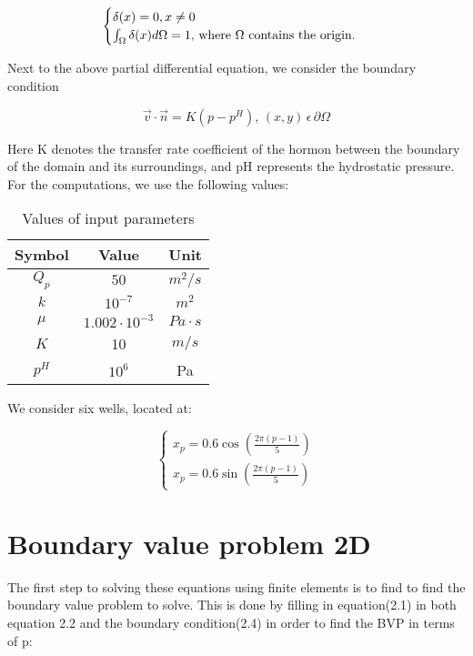 \documentclass{report}
\begin{document}
\begin{equation}
	\begin{cases} 
		\delta(x) = 0,x \neq 0 \\ \int_{\Omega}\delta(x)d\Omega = 1,$  where $\Omega $  contains the origin.$
	\end{cases} 
\end{equation}

\medskip
Next to the above partial differential equation, we consider the boundary condition 

\begin{equation}
	\vec{v}\cdot\vec{n}=K(p-p^H), \, (x,y)\, \epsilon\,  \partial\Omega
\end{equation}
\bigskip

Here K denotes the transfer rate coefficient of the hormon between the boundary of the domain and its surroundings, and pH represents the hydrostatic pressure. For the computations, we use the following values:


\begin{table}[ht]
	\caption{Values of input parameters} %
	\centering %
	\begin{tabular}{c c c} %
		\hline\hline %
		Symbol & Value & Unit\\ [0.5ex] %
		\hline %
		$Q_p$ & $50$ & $m^2/s$ \\ %
		$k$ & $10^{-7}$ & $m^2$ \\
		$\mu$ & $1.002\cdot 10^{-3}$ & $Pa\cdot s$ \\
		$K$ & 10 & $m/s$ \\
		$p^H$ & $10^6$ & Pa \\ [1ex] %
		\hline %
	\end{tabular}
	\label{table:nonlin} %
\end{table}
\bigskip

We consider six wells, located at:


\begin{equation}
	\begin{cases} 
		x_p=0.6\cos(\frac{2\pi (p-1)}{5}) \\ x_p=0.6\sin(\frac{2\pi (p-1)}{5})
	\end{cases} 
\end{equation}


\section{Boundary value problem 2D}
The first step to solving these equations using finite elements is to find to find the boundary value problem to solve. This is done by filling in equation(2.1) in both equation 2.2 and the boundary condition(2.4) in order to find the BVP in terms of p:
\vspace{5mm}
\end{document}
